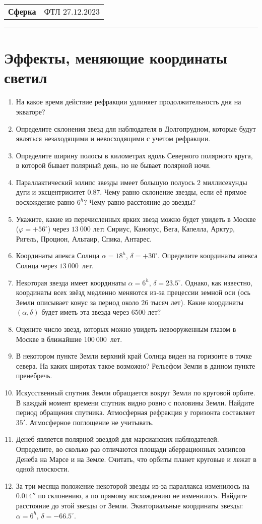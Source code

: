 \documentclass[12pt]{article}
\begin{document}
\begin{tabularx}{\textwidth}{Xr}
{\Large \textbf{Сферка}} & ФТЛ $27.12.2023$ \\
\end{tabularx}
\noindent\rule{\textwidth}{0.4pt}
\section*{Эффекты, меняющие координаты светил}
\begin{enumerate}
    \item{На какое время действие рефракции удлиняет продолжительность дня на экваторе?}
    \item{Определите склонения звезд для наблюдателя в Долгопрудном, которые будут являться незаходящими и невосходящими с учетом рефракции.}
    \item{Определите ширину полосы в километрах вдоль Северного полярного круга, в которой бывает полярный день, но не бывает полярной ночи.}
    \item{Параллактический эллипс звезды имеет большую полуось $2$ миллисекунды дуги и эксцентриситет $0.87$. Чему равно склонение звезды, если её прямое восхождение равно $6^h$? Чему равно расстояние до звезды?}
    \item{Укажите, какие из перечисленных ярких звезд можно будет увидеть в Москве ($\varphi=+56^{\circ}$) через $13~000$ лет: Сириус, Канопус, Вега, Капелла, Арктур, Ригель, Процион, Альтаир, Спика, Антарес.} 	
    \item{Координаты апекса Солнца $\alpha=18^h$, $\delta=+30^{\circ}$. Определите координаты апекса Солнца через $13~000$~лет.}
    \item{Некоторая звезда имеет координаты $\alpha = 6^h$, $\delta = 23.5^{\circ}$. Однако, как известно, координаты всех звёзд медленно меняются из-за прецессии земной оси (ось Земли описывает конус за период около $26$ тысяч лет). Какие координаты $(\alpha, \delta)$ будет иметь эта звезда через $6500$ лет?}
    \item{Оцените число звезд, которых можно увидеть невооруженным глазом в Москве в ближайшие $100~000$~лет.}
    \item{В некотором пункте Земли верхний край Солнца виден на горизонте в точке севера. На каких широтах такое возможно? Рельефом Земли в данном пункте пренебречь.}
    \item{Искусственный спутник Земли обращается вокруг Земли по круговой орбите. В каждый момент времени спутник видно ровно с половины Земли. Найдите период обращения спутника. Атмосферная рефракция у горизонта составляет $35'$. Атмосферное поглощение не учитывать.}
    \item{Денеб является полярной звездой для марсианских наблюдателей. Определите, во сколько раз отличаются площади аберрационных эллипсов Денеба на Марсе и на Земле. Считать, что орбиты планет круговые и лежат в одной плоскости.}
    \item{За три месяца положение некоторой звезды из-за параллакса изменилось на $0.014''$ по склонению, а по прямому восхождению не изменилось. Найдите расстояние до этой звезды от Земли. Экваториальные координаты звезды: $\alpha=6^h$, $\delta=-66.5^{\circ}$.}
\end{enumerate}
\end{document}
